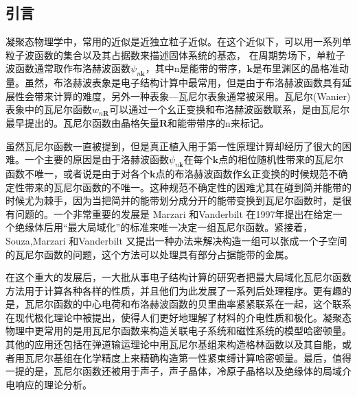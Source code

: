 \subsection{引言}
凝聚态物理学中，常用的近似是近独立粒子近似。在这个近似下，可以用一系列单粒子波函数的集合以及其占据数来描述固体系统的基态，
在周期势场下，单粒子波函数通常取作布洛赫波函数$\psi_{n\bm{k}}$，其中n是能带的带序，$\bm{k}$是布里渊区的晶格准动量。虽然，布洛赫波表象是电子结构计算中最常用，但是由于布洛赫波函数具有延展性会带来计算的难度，另外一种表象—瓦尼尔表象通常被采用。瓦尼尔(Wanier)表象中的瓦尼尔函数$w_{n\bm{R}}$可以通过一个幺正变换和布洛赫波函数联系，是由瓦尼尔最早提出的。瓦尼尔函数由晶格矢量$\bm{R}$和能带带序的n来标记。

虽然瓦尼尔函数一直被提到，但是真正植入用于第一性原理计算却经历了很大的困难。一个主要的原因是由于洛赫波函数$\psi_{n\bm{k}}$在每个$\bm{k}$点的相位随机性带来的瓦尼尔函数不唯一，或者说是由于对各个$\bm{k}$点的布洛赫波函数作幺正变换的时候规范不确定性带来的瓦尼尔函数的不唯一。这种规范不确定性的困难尤其在碰到简并能带的时候尤为棘手，因为当把简并的能带划分成分开的能带变换到瓦尼尔函数时，是很有问题的。一个非常重要的发展是	Marzari 和Vanderbilt 在1997年提出在给定一个绝缘体后用“最大局域化”的标准来唯一决定一组瓦尼尔函数。紧接着，Souza,Marzari 和Vanderbilt 又提出一种办法来解决构造一组可以张成一个子空间的瓦尼尔函数的问题，这个方法可以处理具有部分占据能带的金属。

在这个重大的发展后，一大批从事电子结构计算的研究者把最大局域化瓦尼尔函数方法用于计算各种各样的性质，并且他们为此发展了一系列后处理程序。更有趣的是，瓦尼尔函数的中心电荷和布洛赫波函数的贝里曲率紧紧联系在一起，这个联系在现代极化理论中被提出，使得人们更好地理解了材料的介电性质和极化。凝聚态物理中更常用的是用瓦尼尔函数来构造关联电子系统和磁性系统的模型哈密顿量。其他的应用还包括在弹道输运理论中用瓦尼尔基组来构造格林函数以及其自能，或者用瓦尼尔基组在化学精度上来精确构造第一性紧束缚计算哈密顿量。最后，值得一提的是，瓦尼尔函数还被用于声子，声子晶体，冷原子晶格以及绝缘体的局域介电响应的理论分析。


